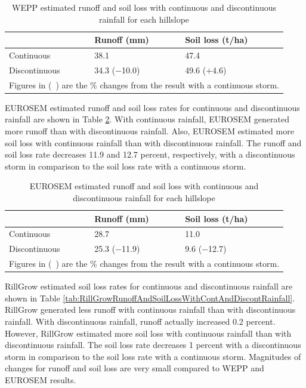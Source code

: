\begin{table}[hbtp]
  \centering
  \caption{WEPP estimated runoff and soil loss with continuous and discontinuous
rainfall for each hillslope}
  \label{tab:EstimatedRunoffForEachHillslope}
    \begin{tabular}{lll}
      \toprule
      & Runoff (mm)& Soil loss (t/ha) \\
      \midrule
      Continuous & 38.1 & 47.4 \\
      Discontinuous & 34.3 ($-$10.0) & 49.6 ($+$4.6)\\
      \bottomrule
      \multicolumn{3}{l}{\footnotesize Figures in (\ ) are the \% changes from
the result with a continuous storm.}
    \end{tabular}
\end{table}

EUROSEM estimated runoff and soil loss rates for continuous and discontinuous
rainfall are shown in Table
\ref{tab:EUROSEMEstimatedSoilLossRatesForEachHillslope}. With continuous
rainfall, EUROSEM generated more runoff than with discontinuous rainfall.
Also, EUROSEM estimated more soil loss with continuous rainfall than with
discontinuous rainfall. The runoff and soil loss rate decreases 11.9 and 12.7
percent, respectively, with a discontinuous storm in comparison to the soil loss
rate with a continuous storm.

\begin{table}[hbtp]
  \centering
  \caption{EUROSEM estimated runoff and soil loss with continuous and
discontinuous rainfall for each hillslope}
  \label{tab:EUROSEMEstimatedSoilLossRatesForEachHillslope}
    \begin{tabular}{lll}
      \toprule
                & Runoff (mm) & Soil loss (t/ha) \\
      \midrule
      Continuous & 28.7 & 11.0 \\
      Discontinuous & 25.3 ($-$11.9)& 9.6 ($-$12.7)\\
      \bottomrule
      \multicolumn{3}{l}{\footnotesize Figures in (\ ) are the \% changes from
the result with a continuous storm.}
    \end{tabular}
\end{table}

RillGrow estimated soil loss rates for continuous and discontinuous rainfall are
shown in Table
\ref{tab:RillGrowRunoffAndSoilLossWithContAndDiscontRainfall}. RillGrow
generated less runoff with continuous rainfall than with discontinuous rainfall.
With discontinuous rainfall, runoff actually increased 0.2 percent. However,
RillGrow estimated more soil loss with continuous rainfall than with
discontinuous rainfall. The soil loss rate decreases 1 percent with a
discontinuous storm in comparison to the soil loss rate with a continuous storm.
Magnitudes of changes for runoff and soil loss are very small compared to WEPP
and EUROSEM results.

